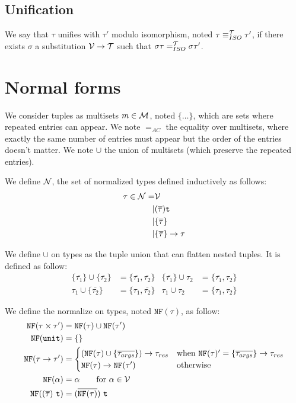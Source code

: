 \documentclass [a4paper,11pt]{scrartcl}
\newcommand{\Var}{{\cal V}}
\newcommand{\tconstr}{\texttt{t}}
\newcommand{\T}{{\cal T}}
\newcommand{\N}{{\cal N}}
\newcommand{\MSet}{{\cal M}}
\newcommand\tprod{\times}
\newcommand\tlist{\overline}
\newcommand\tmset[1]{\{\overline{#1}\}}
\begin{document}
\subsection{Unification}

\newcommand\unifT{\equiv^{\T}_{ISO}}

We say that $\tau$ unifies with $\tau'$ modulo isomorphism, noted $\tau \unifT \tau'$, if there exists $\sigma$ a substitution $\Var \to \T$ such that $\sigma\tau \eqT \sigma\tau'$.

\section{Normal forms}

\newcommand\eqAC{=_{AC}}
\newcommand\nf[1]{\texttt{NF}(#1)}

We consider tuples as multisets $m \in \MSet$, noted $\{\dots\}$,
which are sets where repeated entries can appear.
We note $\eqAC$ the equality over multisets, where exactly
the same number of entries must appear but the order of the entries doesn't matter.
We note $\cup$ the union of multisets (which preserve the repeated entries).

We define $\N$, the set of normalized types defined
inductively as follows:
\begin{align*}
  \tau \in \N
  =& \Var\\
  |& (\tlist\tau) \tconstr\\
  |& \tmset\tau\\
  |& \tmset\tau \to \tau
\end{align*}

We define $\cup$ on types as the tuple union that can flatten
nested tuples. It is defined as follow:
\begin{align*}
  \tmset{\tau_1} \cup \tmset{\tau_2} &= \{\tlist{\tau_1},\tlist{\tau_2}\}&
  \tmset{\tau_1} \cup \tau_2 &= \{\tlist{\tau_1},\tau_2\}\\
  \tau_1 \cup \tmset{\tau_2} &= \{\tau_1,\tlist{\tau_2}\}&
  \tau_1 \cup \tau_2 &= \{\tau_1,\tau_2\}
\end{align*}


We define the normalize on types, noted $\nf\tau$, as follow:
\begin{align*}
  \nf{\tau \tprod \tau'}
  &= \nf\tau \cup \nf{\tau'}\\
  \nf{\texttt{unit}} &= \{\}\\
  \nf{\tau \to \tau'}
  &= \begin{cases}
    (\nf\tau \cup \tmset{\tau_{args}}) \to \tau_{res} & \text{when $\nf\tau' = \tmset{\tau_{args}} \to \tau_{res}$}\\
    \nf\tau \to \nf{\tau'} & \text{otherwise}
  \end{cases} \\
  \nf{\alpha} &= \alpha \qquad\text{for }\alpha\in\Var\\
  \nf{(\tlist\tau)\ \tconstr} &= (\tlist{\nf\tau})\ \tconstr
\end{align*}
\end{document}

